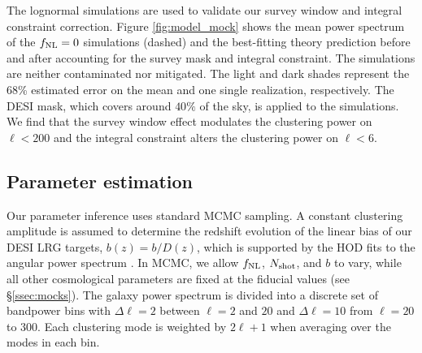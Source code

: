 The lognormal simulations are used to validate our survey window and integral constraint correction. Figure \ref{fig:model_mock} shows the mean power spectrum of the $f_{\rm NL}=0$ simulations (dashed) and the best-fitting theory prediction before and after accounting for the survey mask and integral constraint. The simulations are neither contaminated nor mitigated. The light and dark shades represent the 68\% estimated error on the mean and one single realization, respectively. The DESI mask, which covers around $40\%$ of the sky, is applied to the simulations. We find that the survey window effect modulates the clustering power on $\ell < 200$ and the integral constraint alters the clustering power on $\ell < 6$.

\subsection{Parameter estimation}

Our parameter inference uses standard MCMC sampling. A constant clustering amplitude is assumed to determine the redshift evolution of the linear bias of our DESI LRG targets, $b(z) = b/D(z)$, which is supported by the HOD fits to the angular power spectrum \citep{zhou2021clustering}. In MCMC, we allow $f_{\rm NL}$, $N_{\rm shot}$, and $b$ to vary, while all other cosmological parameters are fixed at the fiducial values (see \S \ref{ssec:mocks}). The galaxy power spectrum is divided into a discrete set of bandpower bins with $\Delta\ell=2$ between $\ell=2$ and $20$ and $\Delta \ell=10$ from $\ell=20$ to $300$. Each clustering mode is weighted by $2\ell+1$ when averaging over the modes in each bin.

